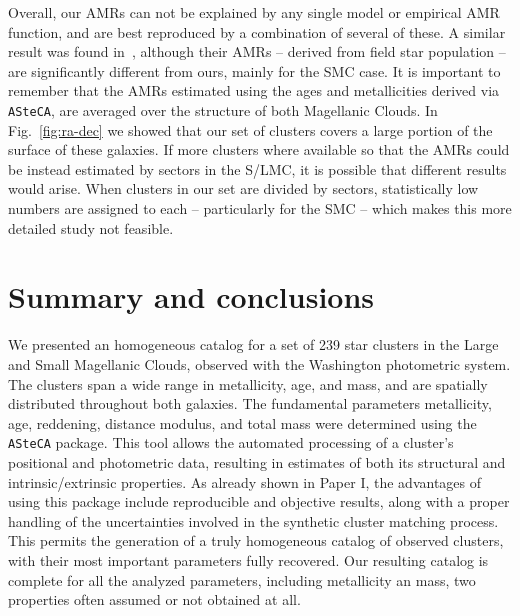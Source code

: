 \documentclass{aa}
\begin{document}
Overall, our AMRs can not be explained by any single model or empirical AMR
function, and are best reproduced by a combination of several of these. A
similar result was found in~\cite{Piatti_Geisler_2013}, although their AMRs --
derived from field star population -- are significantly different from ours,
mainly for the SMC case.
%
It is important to remember that the AMRs estimated using the ages and
metallicities derived via \texttt{ASteCA}, are averaged over the structure of
both Magellanic Clouds. In Fig.~\ref{fig:ra-dec} we showed that our set of
clusters covers a large portion of the surface of these galaxies.
%
If more clusters where available so that the AMRs could be instead estimated by
sectors in the S/LMC, it is possible that different results would arise. When
clusters in our set are divided by sectors, statistically low numbers are
assigned to each -- particularly for the SMC -- which makes this more detailed
study not feasible.





\section{Summary and conclusions}
\label{sec:summ-concl}

We presented an homogeneous catalog for a set of 239 star clusters in the
Large and Small Magellanic Clouds, observed with the Washington photometric
system. The clusters span a wide range in metallicity, age, and mass, and are
spatially distributed throughout both galaxies.
%
The fundamental parameters metallicity, age, reddening, distance modulus, and
total mass were determined using the \texttt{ASteCA} package.
%
This tool allows the automated processing of a cluster's positional and
photometric data, resulting in estimates of both its structural and
intrinsic/extrinsic properties.
%
As already shown in Paper I, the advantages of using this package include
reproducible and objective results, along with a proper handling of the
uncertainties involved in the synthetic cluster matching process.
%
This permits the generation of a truly homogeneous catalog of observed
clusters, with their most important parameters fully recovered.
%
Our resulting catalog is complete for all the analyzed parameters, including
metallicity an mass, two properties often assumed or not obtained at all.
\end{document}
